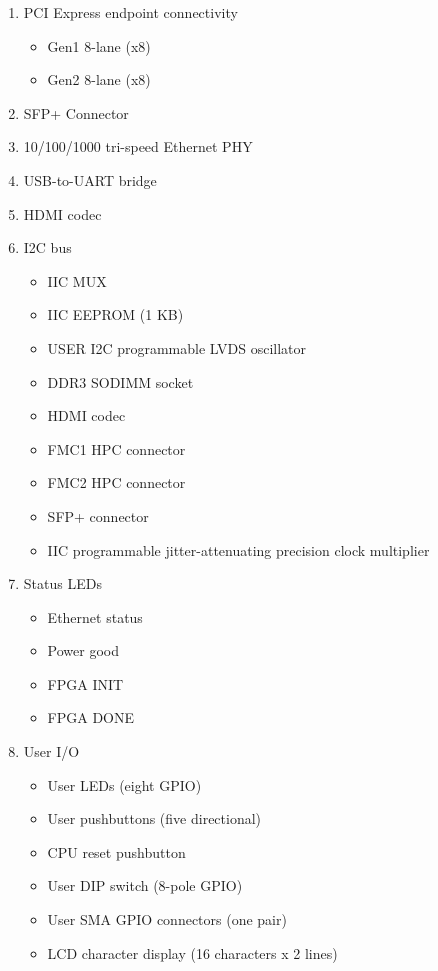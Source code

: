 \begin{enumerate}
  \item PCI Express endpoint connectivity

  \begin{itemize}
    \item Gen1 8-lane (x8)
    \item Gen2 8-lane (x8)
  \end{itemize}

  \item SFP+ Connector
  \item 10/100/1000 tri-speed Ethernet PHY
  \item USB-to-UART bridge
  \item HDMI codec
  \item I2C bus

  \begin{itemize}
    \item IIC MUX
    \item IIC EEPROM (1 KB)
    \item USER I2C programmable LVDS oscillator
    \item DDR3 SODIMM socket
    \item HDMI codec
    \item FMC1 HPC connector
    \item FMC2 HPC connector
    \item SFP+ connector
    \item IIC programmable jitter-attenuating precision clock multiplier
  \end{itemize}

  \item Status LEDs

  \begin{itemize}
    \item Ethernet status
    \item Power good
    \item FPGA INIT
    \item FPGA DONE
  \end{itemize}

  \item User I/O
  \begin{itemize}
    \item User LEDs (eight GPIO)
    \item User pushbuttons (five directional)
    \item CPU reset pushbutton
    \item User DIP switch (8-pole GPIO)
    \item User SMA GPIO connectors (one pair)
    \item LCD character display (16 characters x 2 lines)
  \end{itemize}


\end{enumerate}

